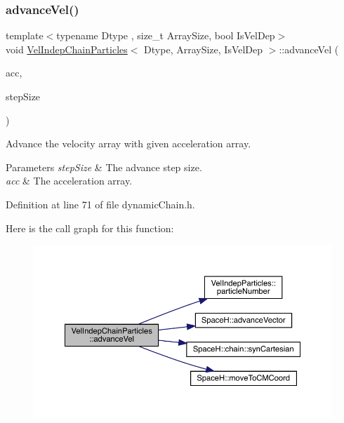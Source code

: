 \subsubsection{\texorpdfstring{advance\+Vel()}{advanceVel()}}
{\footnotesize\ttfamily template$<$typename Dtype , size\+\_\+t Array\+Size, bool Is\+Vel\+Dep$>$ \\
void \mbox{\hyperlink{class_vel_indep_chain_particles}{Vel\+Indep\+Chain\+Particles}}$<$ Dtype, Array\+Size, Is\+Vel\+Dep $>$\+::advance\+Vel (\begin{DoxyParamCaption}\item[{const \mbox{\hyperlink{class_vel_indep_particles_a27580f65b6523bfb6900520af2e44708}{Vector\+Array}} \&}]{acc,  }\item[{\mbox{\hyperlink{class_vel_indep_particles_a5d275b22f0d759f360ddd80e78f4b466}{Scalar}}}]{step\+Size }\end{DoxyParamCaption})\hspace{0.3cm}{\ttfamily [inline]}}



Advance the velocity array with given acceleration array. 


\begin{DoxyParams}{Parameters}
{\em step\+Size} & The advance step size. \\
\hline
{\em acc} & The acceleration array. \\
\hline
\end{DoxyParams}


Definition at line 71 of file dynamic\+Chain.\+h.

Here is the call graph for this function\+:\nopagebreak
\begin{figure}[H]
\begin{center}
\leavevmode
\includegraphics[width=350pt]{class_vel_indep_chain_particles_aa09b6bf7f9efbe1da4de3d106581b3a6_cgraph}
\end{center}
\end{figure}
\mbox{\label{class_vel_indep_chain_particles_a0ad298c834406f31f95df62694d51869}} 
